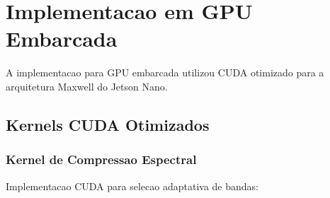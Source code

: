 \section{Implementacao em GPU Embarcada}\label{sec:implementacao_gpu}

A implementacao para GPU embarcada utilizou CUDA otimizado para a arquitetura Maxwell do Jetson Nano.

\subsection{Kernels CUDA Otimizados}

\subsubsection{Kernel de Compressao Espectral}
Implementacao CUDA para selecao adaptativa de bandas:

